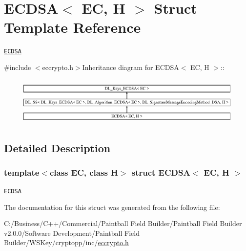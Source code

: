 \hypertarget{struct_e_c_d_s_a}{
\section{ECDSA$<$ EC, H $>$ Struct Template Reference}
\label{struct_e_c_d_s_a}
}


\href{http://www.weidai.com/scan-mirror/sig.html#ECDSA}{\tt ECDSA}  


{\ttfamily \#include $<$eccrypto.h$>$}Inheritance diagram for ECDSA$<$ EC, H $>$::\begin{figure}[H]
\begin{center}
\leavevmode
\includegraphics[height=2.45614cm]{struct_e_c_d_s_a}
\end{center}
\end{figure}


\subsection{Detailed Description}
\subsubsection*{template$<$class EC, class H$>$ struct ECDSA$<$ EC, H $>$}

\href{http://www.weidai.com/scan-mirror/sig.html#ECDSA}{\tt ECDSA} 

The documentation for this struct was generated from the following file:\begin{DoxyCompactItemize}
\item 
C:/Business/C++/Commercial/Paintball Field Builder/Paintball Field Builder v2.0.0/Software Development/Paintball Field Builder/WSKey/cryptopp/inc/\hyperlink{eccrypto_8h}{eccrypto.h}\end{DoxyCompactItemize}
